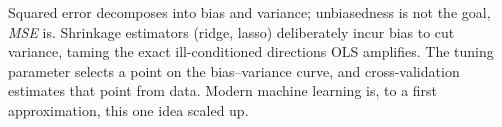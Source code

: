 \begin{keybox}
Squared error decomposes into bias and variance; unbiasedness is not the goal, \emph{MSE} is. Shrinkage estimators (ridge, lasso) deliberately incur bias to cut variance, taming the exact ill-conditioned directions OLS amplifies. The tuning parameter selects a point on the bias--variance curve, and cross-validation estimates that point from data. Modern machine learning is, to a first approximation, this one idea scaled up.
\end{keybox}
